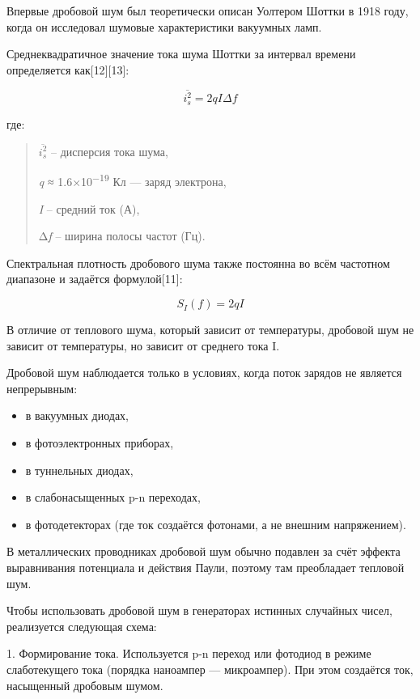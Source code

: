 Впервые дробовой шум был теоретически описан Уолтером Шоттки в 1918
году, когда он исследовал шумовые характеристики вакуумных ламп.

Среднеквадратичное значение тока шума Шоттки за интервал времени
определяется как{[}12{]}{[}13{]}:

\[\overline{i_{s}^{2}} = 2qI\Delta f\]

где:

\begin{quote}
\(\overline{i_{s}^{2}}\)\hspace{0pt}\hspace{0pt} -- дисперсия тока шума,

\emph{q} ≈ 1.6×10\textsuperscript{−19} Кл --- заряд электрона,

\emph{I} -- средний ток (А),

Δ\emph{f} -- ширина полосы частот (Гц).
\end{quote}

Спектральная плотность дробового шума также постоянна во всём частотном
диапазоне и задаётся формулой{[}11{]}:

\[S_{I}(f) = 2qI\]

В отличие от теплового шума, который зависит от температуры, дробовой
шум не зависит от температуры, но зависит от среднего тока I.

Дробовой шум наблюдается только в условиях, когда поток зарядов не
является непрерывным:

\begin{itemize}
\item
  в вакуумных диодах,
\item
  в фотоэлектронных приборах,
\item
  в туннельных диодах,
\item
  в слабонасыщенных p-n переходах,
\item
  в фотодетекторах (где ток создаётся фотонами, а не внешним
  напряжением).
\end{itemize}

В металлических проводниках дробовой шум обычно подавлен за счёт эффекта
выравнивания потенциала и действия Паули, поэтому там преобладает
тепловой шум.

Чтобы использовать дробовой шум в генераторах истинных случайных чисел,
реализуется следующая схема:

1. Формирование тока. Используется p-n переход или фотодиод в режиме
слаботекущего тока (порядка наноампер --- микроампер). При этом
создаётся ток, насыщенный дробовым шумом.

